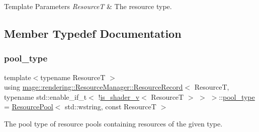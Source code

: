 \begin{DoxyTemplParams}{Template Parameters}
{\em ResourceT} & The resource type. \\
\hline
\end{DoxyTemplParams}


\subsection{Member Typedef Documentation}
\mbox{\label{structmage_1_1rendering_1_1_resource_manager_1_1_resource_record_3_01_resource_t_00_01typename_0d1bec05cbaa53974b1eda0724091f851_a7c24663bbbfdf875688c2991f7fbac93}} 
\subsubsection{\texorpdfstring{pool\+\_\+type}{pool\_type}}
{\footnotesize\ttfamily template$<$typename ResourceT $>$ \\
using \mbox{\hyperlink{structmage_1_1rendering_1_1_resource_manager_1_1_resource_record}{mage\+::rendering\+::\+Resource\+Manager\+::\+Resource\+Record}}$<$ ResourceT, typename std\+::enable\+\_\+if\+\_\+t$<$ !\mbox{\hyperlink{namespacemage_1_1rendering_a31fdbf9c96bd42e878e844c2b32b2fb9}{is\+\_\+shader\+\_\+v}}$<$ ResourceT $>$ $>$ $>$\+::\mbox{\hyperlink{structmage_1_1rendering_1_1_resource_manager_1_1_resource_record_3_01_resource_t_00_01typename_0d1bec05cbaa53974b1eda0724091f851_a7c24663bbbfdf875688c2991f7fbac93}{pool\+\_\+type}} =  \mbox{\hyperlink{classmage_1_1_resource_pool}{Resource\+Pool}}$<$ std\+::wstring, const ResourceT $>$}

The pool type of resource pools containing resources of the given type. 